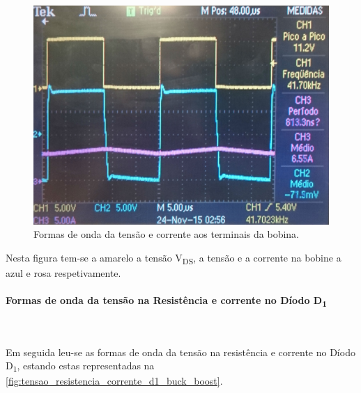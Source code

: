 \documentclass[a4paper,11pt]{article}
\numberwithin{equation}{section}
\begin{document}
\begin{figure}[H]
	\centering
	\includegraphics[keepaspectratio=true, scale=0.14]{img/figs/tensao_corrente_bobina_buck_boost}
	\caption{Formas de onda da tensão e corrente aos terminais da bobina.}
	\label{fig:tensao_corrente_bobina_buck_boost}
	\vspace{-0.8em}
\end{figure}

Nesta figura tem-se a amarelo a tensão V\textsubscript{DS}, a tensão e a corrente na bobine a azul e rosa respetivamente.

\paragraph{Formas de onda da tensão na Resistência e corrente no Díodo D\textsubscript{1}}\mbox{}\

Em seguida leu-se as formas de onda da tensão na resistência e corrente no Díodo D\textsubscript{1}, estando estas representadas na \autoref{fig:tensao_resistencia_corrente_d1_buck_boost}.
\end{document}
